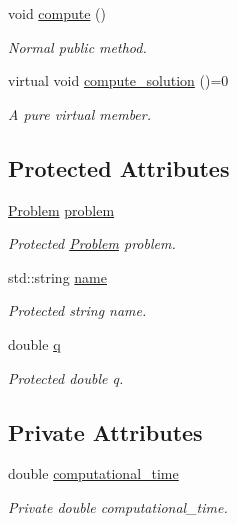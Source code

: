 \begin{DoxyCompactItemize}
void \hyperlink{classMethod_a50aea9f4e6101bf7c37f145177b72693}{compute} ()
\begin{DoxyCompactList}\small\item\em Normal public method. \end{DoxyCompactList}\item 
virtual void \hyperlink{classMethod_af3dcec8e066214e82d8b4578a4a55076}{compute\+\_\+solution} ()=0
\begin{DoxyCompactList}\small\item\em A pure virtual member. \end{DoxyCompactList}\end{DoxyCompactItemize}
\subsection*{Protected Attributes}
\begin{DoxyCompactItemize}
\item 
\hyperlink{classProblem}{Problem} \hyperlink{classMethod_a29a08a679b5d30a8c813766308205041}{problem}
\begin{DoxyCompactList}\small\item\em Protected \hyperlink{classProblem}{Problem} problem. \end{DoxyCompactList}\item 
std\+::string \hyperlink{classMethod_a8648aeee4e6ebb1adc52522ac26ac523}{name}
\begin{DoxyCompactList}\small\item\em Protected string name. \end{DoxyCompactList}\item 
double \hyperlink{classMethod_a794257d62bedf3691c3c0a2b921b8886}{q}
\begin{DoxyCompactList}\small\item\em Protected double q. \end{DoxyCompactList}\end{DoxyCompactItemize}
\subsection*{Private Attributes}
\begin{DoxyCompactItemize}
\item 
double \hyperlink{classMethod_a4504c8cdb13651c87485d76d6e20d7ef}{computational\+\_\+time}
\begin{DoxyCompactList}\small\item\em Private double computational\+\_\+time. \end{DoxyCompactList}\end{DoxyCompactItemize}


